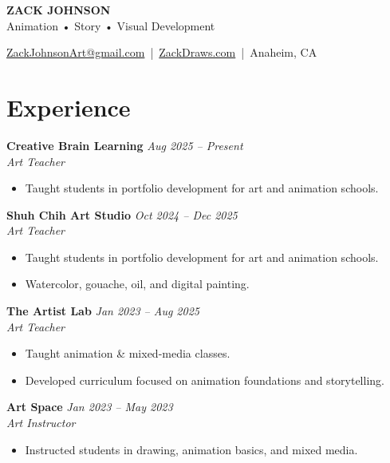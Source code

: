 \documentclass[11pt,letterpaper]{article}
\begin{document}
\raggedright

{\huge \textbf{ZACK JOHNSON}}\\[-2pt]
\large Animation • Story • Visual Development

\vspace{1pt}
\small
\href{mailto:ZackJohnsonArt@gmail.com}{ZackJohnsonArt@gmail.com} \,|\, 
\href{https://ZackDraws.com}{ZackDraws.com} \,|\, 
Anaheim, CA
\normalsize

\section{Experience}

\textbf{Creative Brain Learning} \hfill \textit{Aug 2025 -- Present}\\
\textit{Art Teacher}
\begin{itemize}
    \item Taught students in portfolio development for art and animation schools.
\end{itemize}

\textbf{Shuh Chih Art Studio} \hfill \textit{Oct 2024 -- Dec 2025}\\
\textit{Art Teacher}
\begin{itemize}
    \item Taught students in portfolio development for art and animation schools.
    \item Watercolor, gouache, oil, and digital painting.
\end{itemize}

\textbf{The Artist Lab} \hfill \textit{Jan 2023 -- Aug 2025}\\
\textit{Art Teacher}
\begin{itemize}
    \item Taught animation & mixed-media classes.
    \item Developed curriculum focused on animation foundations and storytelling.
\end{itemize}

\textbf{Art Space} \hfill \textit{Jan 2023 -- May 2023}\\
\textit{Art Instructor}
\begin{itemize}
    \item Instructed students in drawing, animation basics, and mixed media.
\end{itemize}
\end{document}
